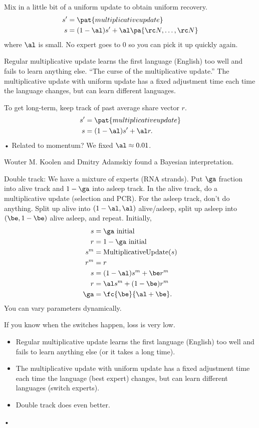 Mix in a little bit of a uniform update to obtain uniform recovery.
\begin{align}
s' &= \pat{multiplicative update}\\
s &= (1-\al)s' + \al\pa{\rc N,\ldots, \rc N}
\end{align}
where $\al$ is small. No expert goes to 0 so you can pick it up quickly again.

Regular multiplicative update learns the first language (English) too well and fails to learn anything else. ``The curse of the multiplicative update.'' The multiplicative update with uniform update  has a fixed adjustment time each time the language changes, but can learn different languages.

To get long-term, keep track of past average share vector $r$.
\begin{align}
s'&=\pat{multiplicative update}\\
s&=(1-\al)s'+\al r.
\end{align}•
Related to momentum? We fixed $\al\approx 0.01$.

Wouter M. Koolen and Dmitry Adamskiy found a Bayesian interpretation. 

Double track: 
We have a mixture of experts (RNA strands). Put $\ga$ fraction into alive track and $1-\ga$ into asleep track. In the alive track, do a multiplicative update (selection and PCR). For the asleep track, don't do anything. Split up alive into $(1-\al,\al)$ alive/asleep, split up asleep into $(\be, 1-\be)$ alive asleep, and repeat. 
Initially, 
\begin{align}
s&=\ga\text{ initial}\\
r&=1-\ga\text{ initial}\\
s^m &= \text{MultiplicativeUpdate}(s)\\
r^m& = r\\
s&=(1-\al)s^m + \be r^m\\
r&=\al s^m + (1-\be) r^m\\
\ga &=\fc{\be}{\al+\be}.
\end{align}
You can vary parameters dynamically.

If you know when the switches happen, loss is very low. 
\begin{itemize}
\item
Regular multiplicative update learns the first language (English) too well and fails to learn anything else (or it takes a long time). 
\item
The multiplicative update with uniform update  has a fixed adjustment time each time the language (best expert) changes, but can learn different languages (switch experts).
\item
Double track does even better. 
\end{itemize}•

